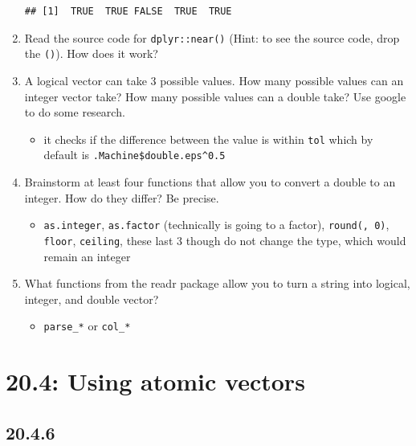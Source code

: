 \documentclass[]{book}
\providecommand{\tightlist}{%
  \setlength{\itemsep}{0pt}\setlength{\parskip}{0pt}}
\theoremstyle{definition}
\theoremstyle{definition}
\theoremstyle{definition}
\theoremstyle{remark}
\begin{document}
\begin{enumerate}
\begin{verbatim}
## [1]  TRUE  TRUE FALSE  TRUE  TRUE
\end{verbatim}
\item
  Read the source code for \texttt{dplyr::near()} (Hint: to see the
  source code, drop the \texttt{()}). How does it work?
\item
  A logical vector can take 3 possible values. How many possible values
  can an integer vector take? How many possible values can a double
  take? Use google to do some research.

  \begin{itemize}
  \tightlist
  \item
    it checks if the difference between the value is within \texttt{tol}
    which by default is \texttt{.Machine\$double.eps\^{}0.5}
  \end{itemize}
\item
  Brainstorm at least four functions that allow you to convert a double
  to an integer. How do they differ? Be precise.

  \begin{itemize}
  \tightlist
  \item
    \texttt{as.integer}, \texttt{as.factor} (technically is going to a
    factor), \texttt{round(,\ 0)}, \texttt{floor}, \texttt{ceiling},
    these last 3 though do not change the type, which would remain an
    integer
  \end{itemize}
\item
  What functions from the readr package allow you to turn a string into
  logical, integer, and double vector?

  \begin{itemize}
  \tightlist
  \item
    \texttt{parse\_*} or \texttt{col\_*}
  \end{itemize}
\end{enumerate}

\hypertarget{using-atomic-vectors}{%
\section{20.4: Using atomic vectors}\label{using-atomic-vectors}}

\hypertarget{section-69}{%
\subsection{20.4.6}\label{section-69}}
\end{document}
